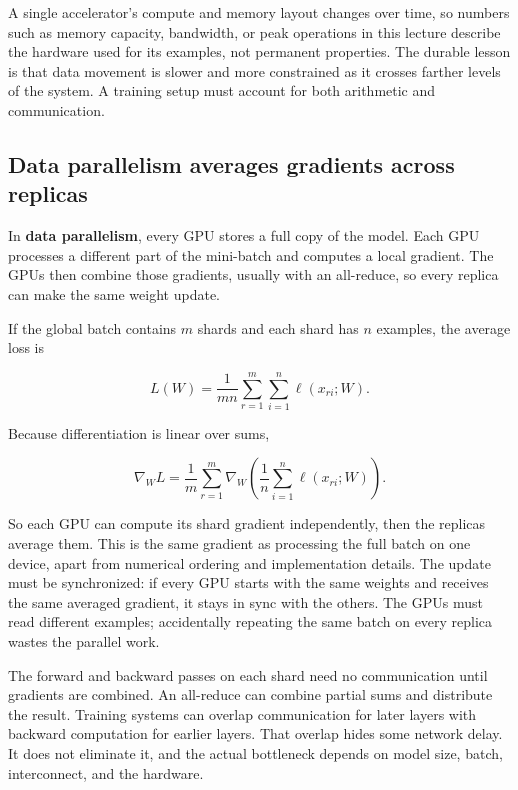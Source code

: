 A single accelerator's compute and memory layout changes over time, so numbers such as memory capacity, bandwidth, or peak operations in this lecture describe the hardware used for its examples, not permanent properties. The durable lesson is that data movement is slower and more constrained as it crosses farther levels of the system. A training setup must account for both arithmetic and communication.

\subsection{Data parallelism averages gradients across replicas}\label{04-visual-computing-ii-ch031-data-parallelism-averages-gradients-across-replicas}

\hypertarget{04-visual-computing-ii-ch031-data-parallelism-averages-gradients-across-replicas}{}

In \textbf{data parallelism}, every GPU stores a full copy of the model. Each GPU processes a different part of the mini-batch and computes a local gradient. The GPUs then combine those gradients, usually with an all-reduce, so every replica can make the same weight update.

If the global batch contains \(m\) shards and each shard has \(n\) examples, the average loss is

\[
L(W)=\frac{1}{mn}\sum_{r=1}^{m}\sum_{i=1}^{n}\ell(x_{ri};W).
\]

Because differentiation is linear over sums,

\[
\nabla_W L=\frac{1}{m}\sum_{r=1}^{m}\nabla_W\left(\frac{1}{n}\sum_{i=1}^{n}\ell(x_{ri};W)\right).
\]

So each GPU can compute its shard gradient independently, then the replicas average them. This is the same gradient as processing the full batch on one device, apart from numerical ordering and implementation details. The update must be synchronized: if every GPU starts with the same weights and receives the same averaged gradient, it stays in sync with the others. The GPUs must read different examples; accidentally repeating the same batch on every replica wastes the parallel work.

The forward and backward passes on each shard need no communication until gradients are combined. An all-reduce can combine partial sums and distribute the result. Training systems can overlap communication for later layers with backward computation for earlier layers. That overlap hides some network delay. It does not eliminate it, and the actual bottleneck depends on model size, batch, interconnect, and the hardware.

